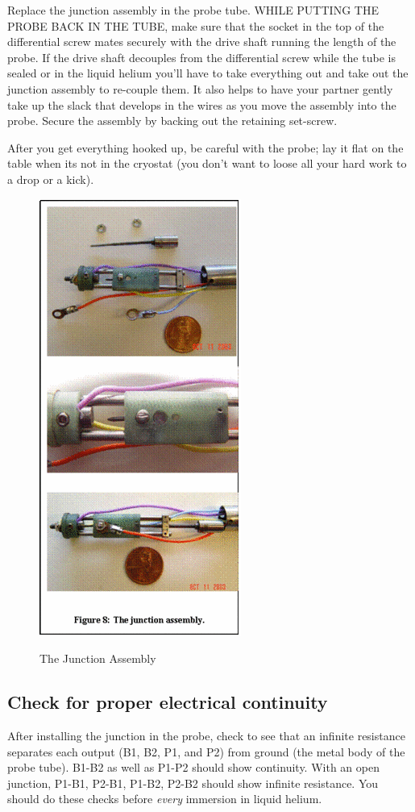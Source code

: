 \documentclass{../lab}
\begin{document}
Replace the junction assembly in the probe tube. WHILE PUTTING THE PROBE BACK IN THE TUBE, make sure that the socket in the top of the differential screw mates securely with the drive shaft running the length of the probe. If the drive shaft decouples from the differential screw while the tube is sealed or in the liquid helium you'll have to take everything out and take out the junction assembly to re-couple them. It also helps to have your partner gently take up the slack that develops in the wires as you move the assembly into the probe. Secure the assembly by backing out the retaining set-screw.

After you get everything hooked up, be careful with the probe; lay it flat on the table when its not in the cryostat (you don't want to loose all your hard work to a drop or a kick).

\begin{figure}[h]
    \centering
    \href{http://experimentationlab.berkeley.edu/sites/default/files/images/250px-JOS13.gif}{\includegraphics[width=0.3\linewidth]{images/250px-JOS13.png}}
    \caption{The Junction Assembly}
    \label{fig:JunctionAssembly}
\end{figure}

\subsection{Check for proper electrical continuity}

After installing the junction in the probe, check to see that an infinite resistance separates each output (B1, B2, P1, and P2) from ground (the metal body of the probe tube). B1-B2 as well as P1-P2 should show continuity. With an open junction, P1-B1, P2-B1, P1-B2, P2-B2 should show infinite resistance. You should do these checks before \emph{every} immersion in liquid helium.
\end{document}
